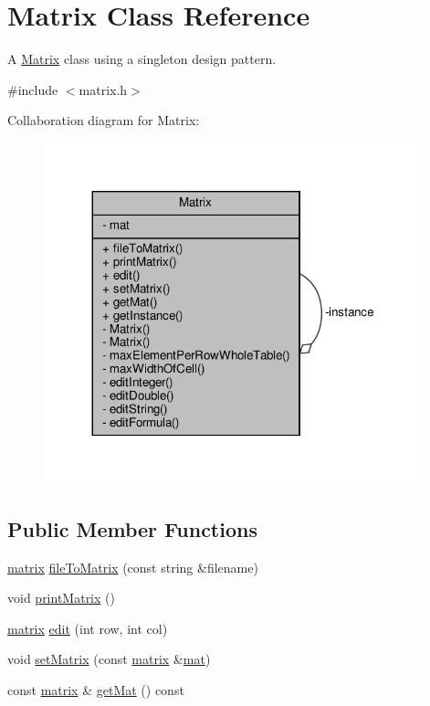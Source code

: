 \hypertarget{class_matrix}{}\section{Matrix Class Reference}
\label{class_matrix}


A \hyperlink{class_matrix}{Matrix} class using a singleton design pattern.  




{\ttfamily \#include $<$matrix.\+h$>$}



Collaboration diagram for Matrix\+:\nopagebreak
\begin{figure}[H]
\begin{center}
\leavevmode
\includegraphics[width=311pt]{class_matrix__coll__graph}
\end{center}
\end{figure}
\subsection*{Public Member Functions}
\begin{DoxyCompactItemize}
\item 
\hyperlink{formula_8h_a869e2a5deeb3daa4c82d6bc91cf20d92}{matrix} \hyperlink{class_matrix_a35eb9dcb01c552fea1f5926db35339ef}{file\+To\+Matrix} (const string \&filename)
\item 
void \hyperlink{class_matrix_aa1967ad240a5ffaf492800044b7275d9}{print\+Matrix} ()
\item 
\hyperlink{formula_8h_a869e2a5deeb3daa4c82d6bc91cf20d92}{matrix} \hyperlink{class_matrix_a34b2269a2b6d06c202439de2e64009ba}{edit} (int row, int col)
\item 
void \hyperlink{class_matrix_a8c45dd1354fa25e14065cab23f3074c0}{set\+Matrix} (const \hyperlink{formula_8h_a869e2a5deeb3daa4c82d6bc91cf20d92}{matrix} \&\hyperlink{class_matrix_a1b0c75c45092426431308172aab92c66}{mat})
\item 
const \hyperlink{formula_8h_a869e2a5deeb3daa4c82d6bc91cf20d92}{matrix} \& \hyperlink{class_matrix_a52d82641f52304c9b6525747cd7f960c}{get\+Mat} () const
\end{DoxyCompactItemize}
